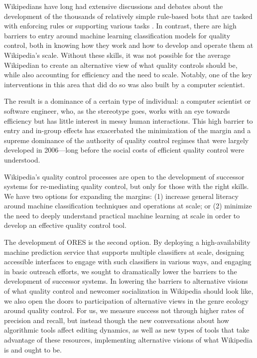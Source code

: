 Wikipedians have long had extensive discussions and debates about the development of the thousands of relatively simple rule-based bots that are tasked with enforcing rules or supporting various tasks \cite{geiger2011lives}. In contrast, there are high barriers to entry around machine learning classification models for quality control, both in knowing how they work and how to develop and operate them at Wikipedia's scale.  Without these skills, it was not possible for the average Wikipedian to create an alternative view of what quality controls should be, while also accounting for efficiency and the need to scale.  Notably, one of the key interventions in this area that did do so was also built by a computer scientist\cite{halfaker2014snuggle}.

The result is a dominance of a certain type of individual: a computer scientist or software engineer, who, as the stereotype goes, works with an eye towards efficiency but has little interest in messy human interactions.  This high barrier to entry and in-group effects has exacerbated the minimization of the margin and a supreme dominance of the authority of quality control regimes that were largely developed in 2006---long before the social costs of efficient quality control were understood.

Wikipedia's quality control processes are open to the development of successor systems for re-mediating quality control, but only for those with the right skills. We have two options for expanding the margins: (1) increase general literacy around machine classification techniques and operations at scale; or (2) minimize the need to deeply understand practical machine learning at scale in order to develop an effective quality control tool.

The development of ORES is the second option.  By deploying a high-availability machine prediction service that supports multiple classifiers at scale, designing accessible interfaces to engage with such classifiers in various ways, and engaging in basic outreach efforts, we sought to dramatically lower the barriers to the development of successor systems. In lowering the barriers to alternative visions of what quality control and newcomer socialization in Wikipedia should look like, we also open the doors to participation of alternative views in the genre ecology around quality control.  For us, we measure success not through higher rates of precision and recall, but instead though the new conversations about how algorithmic tools affect editing dynamics, as well as new types of tools that take advantage of these resources, implementing alternative visions of what Wikipedia is and ought to be.
